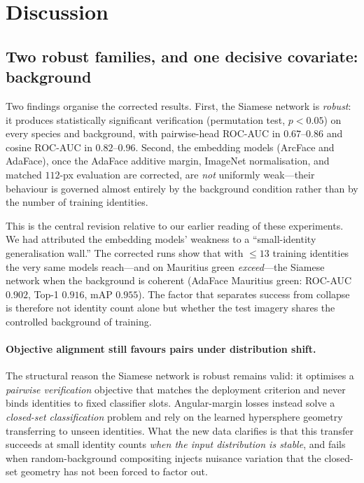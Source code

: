 \section{Discussion}
\label{sec:discussion}

\subsection{Two robust families, and one decisive covariate: background}

Two findings organise the corrected results.  First, the Siamese network is
\emph{robust}: it produces statistically significant verification (permutation test,
$p<0.05$) on every species and background, with pairwise-head ROC-AUC in
$0.67$--$0.86$ and cosine ROC-AUC in $0.82$--$0.96$.  Second, the embedding models
(ArcFace and AdaFace), once the AdaFace additive margin, ImageNet normalisation, and
matched $112$-px evaluation are corrected, are \emph{not} uniformly weak---their
behaviour is governed almost entirely by the background condition rather than by the
number of training identities.

This is the central revision relative to our earlier reading of these experiments.  We
had attributed the embedding models' weakness to a ``small-identity generalisation
wall.''  The corrected runs show that with $\le 13$ training identities the very same
models reach---and on Mauritius green \emph{exceed}---the Siamese network when the
background is coherent (AdaFace Mauritius green: ROC-AUC $0.902$, Top-1 $0.916$, mAP
$0.955$).  The factor that separates success from collapse is therefore not identity
count alone but whether the test imagery shares the controlled background of training.

\paragraph{Objective alignment still favours pairs under distribution shift.}
The structural reason the Siamese network is robust remains valid: it optimises a
\emph{pairwise verification} objective that matches the deployment criterion and never
binds identities to fixed classifier slots.  Angular-margin losses instead solve a
\emph{closed-set classification} problem and rely on the learned hypersphere geometry
transferring to unseen identities.  What the new data clarifies is that this transfer
succeeds at small identity counts \emph{when the input distribution is stable}, and
fails when random-background compositing injects nuisance variation that the
closed-set geometry has not been forced to factor out.

